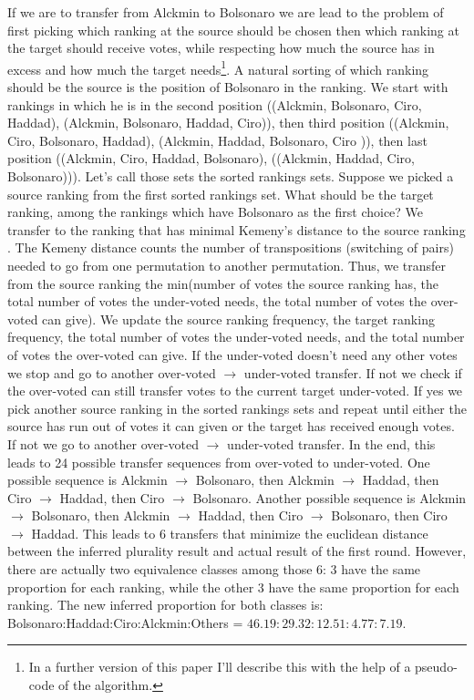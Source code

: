 \documentclass[hidelinks,11pt]{article}
\begin{document}
 If we are to transfer from Alckmin to Bolsonaro we are lead to the problem of first
picking which ranking at the source should be chosen then which ranking at the
target should receive votes, while respecting how much the source has in excess
and how much the target needs\footnote{In a further version of this paper
  I'll describe this with the help of a pseudo-code of the algorithm.}. A
natural sorting of which ranking should be the source is the position of
Bolsonaro in the ranking. We start with rankings in which he is in the second
position ((Alckmin, Bolsonaro, Ciro, Haddad), (Alckmin, Bolsonaro, Haddad,
Ciro)), then third position ((Alckmin, Ciro, Bolsonaro, Haddad), (Alckmin,
Haddad, Bolsonaro, Ciro )), then last position ((Alckmin, Ciro, Haddad,
Bolsonaro), ((Alckmin, Haddad, Ciro, Bolsonaro))). Let's call those sets the
sorted rankings sets. Suppose we picked a source ranking from the first sorted
rankings set. What should be the target ranking, among the rankings which have
Bolsonaro as the first choice? We transfer to the ranking that has minimal
Kemeny's distance to the source ranking \parencite{nurmi2002voting}. The Kemeny
distance counts the number of transpositions (switching of pairs) needed to go
from one permutation to another permutation. Thus, we transfer from the source
ranking the min(number of votes the source ranking has, the total number of
votes the under-voted needs, the total number of votes the over-voted can give).
We update the source ranking frequency, the target ranking frequency, the total
number of votes the under-voted needs, and the total number of votes the
over-voted can give. If the under-voted doesn't need any other votes we stop and
go to another over-voted \(\to\) under-voted transfer. If not we check if the
over-voted can still transfer votes to the current target under-voted. If yes we
pick another source ranking in the sorted rankings sets and repeat until either
the source has run out of votes it can given or the target has received enough
votes. If not we go to another over-voted \(\to\) under-voted transfer. In the end, this leads to 24 possible transfer sequences from over-voted
to under-voted. One possible sequence is Alckmin \(\to\) Bolsonaro, then Alckmin
\(\to\) Haddad, then Ciro \(\to\) Haddad, then Ciro \(\to\) Bolsonaro. Another
possible sequence is  Alckmin \(\to\) Bolsonaro, then Alckmin \(\to\) Haddad, then
Ciro \(\to\) Bolsonaro, then Ciro \(\to\) Haddad. This leads to 6 transfers that
minimize the euclidean distance between the inferred plurality result and actual
result of the first round. However, there are actually two equivalence classes
among those 6: 3 have the same proportion for each ranking, while the other 3
have the same proportion for each ranking. The new inferred proportion for both
classes is: Bolsonaro:Haddad:Ciro:Alckmin:Others =
\(46.19:29.32:12.51:4.77:7.19 \).
\end{document}

